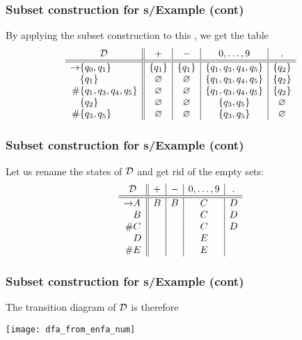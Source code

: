 % 
\begin{frame}
\frametitle{Subset construction for {\eNFA}s/Example (cont)}

By applying the subset construction to this \eNFA, we get the table
\[
\begin{array}{r@{}l||c|c|c|c}
\multicolumn{2}{c||}{\cal D} & + & - & 0, \ldots, 9 & \mathtt{.}\\
\hline\hline
\rightarrow 
   & \{q_0,q_1\} 
             & \{q_1\} & \{q_1\} & \{q_1, q_3, q_4, q_5\} & \{q_2\}\\
   & \{q_1\} & \varnothing  & \varnothing & \{q_1, q_3, q_4, q_5\} 
             & \{q_2\}\\
\# & \{q_1, q_3, q_4, q_5\} 
             & \varnothing  & \varnothing & \{q_1, q_3, q_4, q_5\} 
             & \{q_2\}\\
   & \{q_2\} & \varnothing & \varnothing & \{q_3, q_5\} & \varnothing\\
\# & \{q_3, q_5\}
             & \varnothing & \varnothing & \{q_3, q_5\} & \varnothing
\end{array}
\]

\end{frame}

% 
\begin{frame}
\frametitle{Subset construction for {\eNFA}s/Example (cont)}

Let us rename the states of \(\cal D\) and get rid of the empty sets:
\[
\begin{array}{r@{}l||c|c|c|c}
\multicolumn{2}{c||}{\cal D} & + & - & 0, \ldots, 9 & \mathtt{.}\\
\hline\hline
\rightarrow 
   & A & B & B & C & D\\
   & B &   &   & C & D\\
\# & C &   &   & C & D\\
   & D &   &   & E &\\
\# & E &   &   & E &
\end{array}
\]

\end{frame}

% 
\begin{frame}
\frametitle{Subset construction for {\eNFA}s/Example (cont)}

The transition diagram of \(\cal D\) is therefore
\begin{center}
\texttt{[image: dfa\_from\_enfa\_num]}
\end{center}

\end{frame}
